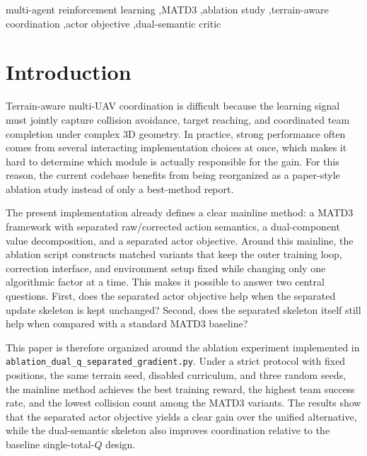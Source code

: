 \documentclass[a4paper,fleqn]{cas-dc}
\begin{document}
\begin{keywords}
multi-agent reinforcement learning \sep MATD3 \sep ablation study \sep terrain-aware coordination \sep actor objective \sep dual-semantic critic
\end{keywords}

\maketitle

\section{Introduction}

Terrain-aware multi-UAV coordination is difficult because the learning signal must jointly capture collision avoidance, target reaching, and coordinated team completion under complex 3D geometry. In practice, strong performance often comes from several interacting implementation choices at once, which makes it hard to determine which module is actually responsible for the gain. For this reason, the current codebase benefits from being reorganized as a paper-style ablation study instead of only a best-method report.

The present implementation already defines a clear mainline method: a MATD3 framework with separated raw/corrected action semantics, a dual-component value decomposition, and a separated actor objective. Around this mainline, the ablation script constructs matched variants that keep the outer training loop, correction interface, and environment setup fixed while changing only one algorithmic factor at a time. This makes it possible to answer two central questions. First, does the separated actor objective help when the separated update skeleton is kept unchanged? Second, does the separated skeleton itself still help when compared with a standard MATD3 baseline?

This paper is therefore organized around the ablation experiment implemented in \texttt{ablation\_dual\_q\_separated\_gradient.py}. Under a strict protocol with fixed positions, the same terrain seed, disabled curriculum, and three random seeds, the mainline method achieves the best training reward, the highest team success rate, and the lowest collision count among the MATD3 variants. The results show that the separated actor objective yields a clear gain over the unified alternative, while the dual-semantic skeleton also improves coordination relative to the baseline single-total-$Q$ design.
\end{document}
